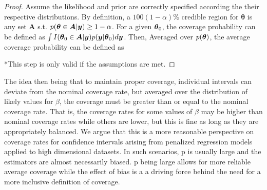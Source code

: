 \begin{proof}
Assume the likelihood and prior are correctly specified according the their respective distributions. By definition, a $100(1-\alpha)\%$ credible region for $\boldsymbol{\theta}$ is any set $\boldsymbol{A}$ s.t. $p(\boldsymbol{\theta} \in \boldsymbol{A} | \boldsymbol{y}) \geq 1 - \alpha$. For a given $\boldsymbol{\theta}_0$, the coverage probability can be defined as $\int I(\boldsymbol{\theta}_0 \in \boldsymbol{A} | \boldsymbol{y}) p(\boldsymbol{y} | \boldsymbol{\theta}_0)d\boldsymbol{y}$. Then, Averaged over $p(\boldsymbol{\theta})$, the average coverage probability can be defined as


*This step is only valid if the assumptions are met.
\end{proof}
The idea then being that to maintain proper coverage, individual intervals can deviate from the nominal coverage rate, but averaged over the distribution of likely values for $\beta$, the coverage must be greater than or equal to the nominal coverage rate. That is, the coverage rates for some values of $\beta$ may be higher than nominal coverage rates while others are lower, but this is fine as long as they are appropriately balanced. We argue that this is a more reasonable perspective on coverage rates for confidence intervals arising from penalized regression models applied to high dimensional datasets. In such scenarios, p is usually large and the estimators are almost necessarily biased. p being large allows for more reliable average coverage while the effect of bias is a a driving force behind the need for a more inclusive definition of coverage.

